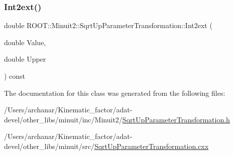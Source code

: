 \subsubsection{\texorpdfstring{Int2ext()}{Int2ext()}\hspace{0.1cm}{\footnotesize\ttfamily [3/3]}}
{\footnotesize\ttfamily double R\+O\+O\+T\+::\+Minuit2\+::\+Sqrt\+Up\+Parameter\+Transformation\+::\+Int2ext (\begin{DoxyParamCaption}\item[{double}]{Value,  }\item[{double}]{Upper }\end{DoxyParamCaption}) const}



The documentation for this class was generated from the following files\+:\begin{DoxyCompactItemize}
\item 
/\+Users/archanar/\+Kinematic\+\_\+factor/adat-\/devel/other\+\_\+libs/minuit/inc/\+Minuit2/\mbox{\hyperlink{adat-devel_2other__libs_2minuit_2inc_2Minuit2_2SqrtUpParameterTransformation_8h}{Sqrt\+Up\+Parameter\+Transformation.\+h}}\item 
/\+Users/archanar/\+Kinematic\+\_\+factor/adat-\/devel/other\+\_\+libs/minuit/src/\mbox{\hyperlink{adat-devel_2other__libs_2minuit_2src_2SqrtUpParameterTransformation_8cxx}{Sqrt\+Up\+Parameter\+Transformation.\+cxx}}\end{DoxyCompactItemize}
